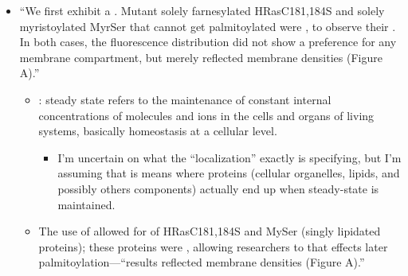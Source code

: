 \documentclass[basic,plain]{inVerba-notes}
\begin{document}
\medskip 
  
  \begin{itemize}
    \item ``We first  exhibit a . Mutant solely farnesylated HRasC181,184S and solely myristoylated MyrSer that cannot get palmitoylated were , to observe their . In both cases, the fluorescence distribution did not show a preference for any membrane compartment, but merely reflected membrane densities (Figure A).''
    \begin{itemize}
      \item {}: steady state refers to the maintenance of constant internal concentrations of molecules and ions in the cells and organs of living systems, basically homeostasis at a cellular level. 
      \begin{itemize}
        \item I'm uncertain on what the ``localization'' exactly is specifying, but I'm assuming that is means where proteins (cellular organelles, lipids, and possibly others components) actually end up when steady-state is maintained.
      \end{itemize}
      \item The use of  allowed for  of HRasC181,184S and MySer (singly lipidated proteins); these proteins were , allowing researchers to  that effects later palmitoylation---``results reflected membrane densities (Figure A).''
    \end{itemize}
  \end{itemize}
  
  \medskip
  \begin{center}

  \end{center}
  \medskip
\end{document}
